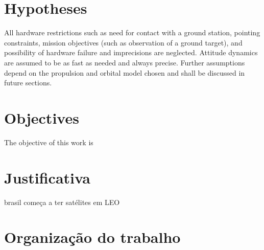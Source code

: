 \section{Hypotheses}

All hardware restrictions such as need for contact with a ground station, pointing constraints, mission objectives (such as observation of a ground target), and possibility of hardware failure and imprecisions are neglected. Attitude dynamics are assumed to be as fast as needed and always precise. Further assumptions depend on the propulsion and orbital model chosen and shall be discussed in future sections.

\section{Objectives}

The objective of this work is 

\section{Justificativa}

brasil começa a ter satélites em LEO

\section{Organização do trabalho}